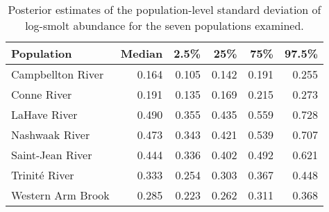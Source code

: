 \begin{table}[ht]
\centering
\caption{Posterior estimates of the population-level standard 
                    deviation of log-smolt abundance for the seven populations examined.} 
\begin{tabular}{lrrrrr}
  \hline
Population & Median & 2.5\% & 25\% & 75\% & 97.5\% \\ 
  \hline
Campbellton River & 0.164 & 0.105 & 0.142 & 0.191 & 0.255 \\ 
  Conne River & 0.191 & 0.135 & 0.169 & 0.215 & 0.273 \\ 
  LaHave River & 0.490 & 0.355 & 0.435 & 0.559 & 0.728 \\ 
  Nashwaak River & 0.473 & 0.343 & 0.421 & 0.539 & 0.707 \\ 
  Saint-Jean River & 0.444 & 0.336 & 0.402 & 0.492 & 0.621 \\ 
  Trinité River & 0.333 & 0.254 & 0.303 & 0.367 & 0.448 \\ 
  Western Arm Brook & 0.285 & 0.223 & 0.262 & 0.311 & 0.368 \\ 
   \hline
\end{tabular}
\end{table}
